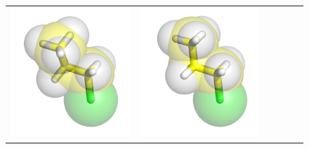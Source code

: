 \documentclass{svmult}
\begin{document}
\begin{figure}
\begin{tabular}{cccccc}
\includegraphics[width=\tmpa]{fig/m003-004} & 
\includegraphics[width=\tmpa]{fig/m003-005} \\

\end{tabular}
\end{figure}
\end{document}
